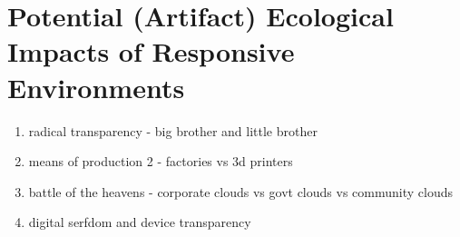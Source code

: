 \section{Potential (Artifact) Ecological Impacts of Responsive Environments}
\label{sec:ecological_impacts}
%
    \begin{enumerate}
        \item radical transparency - big brother and little brother
        \item means of production 2 - factories vs 3d printers
        \item battle of the heavens - corporate clouds vs govt clouds vs community clouds
        \item digital serfdom and device transparency
    \end{enumerate}



